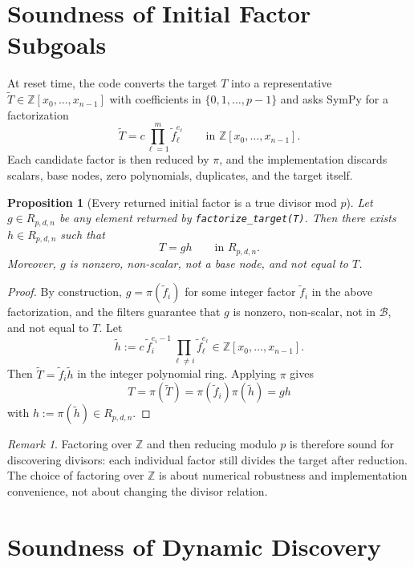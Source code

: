 \documentclass[11pt]{article}
\newtheorem{proposition}[theorem]{Proposition}
\theoremstyle{remark}
\newtheorem{remark}[theorem]{Remark}
\newcommand{\Z}{\mathbb{Z}}
\newcommand{\B}{\mathcal{B}}
\begin{document}
\section{Soundness of Initial Factor Subgoals}

At reset time, the code converts the target $T$ into a representative
$\widetilde{T} \in \Z[x_0,\dots,x_{n-1}]$ with coefficients in
$\{0,1,\dots,p-1\}$ and asks SymPy for a factorization
\[
\widetilde{T}
=
c \prod_{\ell=1}^m \widetilde{f}_{\ell}^{e_\ell}
\qquad
\text{in }
\Z[x_0,\dots,x_{n-1}].
\]
Each candidate factor is then reduced by $\pi$, and the implementation discards
scalars, base nodes, zero polynomials, duplicates, and the target itself.

\begin{proposition}[Every returned initial factor is a true divisor mod $p$]
Let $g \in R_{p,d,n}$ be any element returned by
\texttt{factorize\_target(T)}. Then there exists
$h \in R_{p,d,n}$ such that
\[
T = g h
\qquad \text{in } R_{p,d,n}.
\]
Moreover, $g$ is nonzero, non-scalar, not a base node, and not equal to $T$.
\end{proposition}

\begin{proof}
By construction, $g = \pi(\widetilde{f}_i)$ for some integer factor
$\widetilde{f}_i$ in the above factorization, and the filters guarantee that
$g$ is nonzero, non-scalar, not in $\B$, and not equal to $T$. Let
\[
\widetilde{h}
:=
c \, \widetilde{f}_i^{e_i-1} \prod_{\ell \neq i} \widetilde{f}_{\ell}^{e_\ell}
\in \Z[x_0,\dots,x_{n-1}].
\]
Then $\widetilde{T} = \widetilde{f}_i \widetilde{h}$ in the integer polynomial
ring. Applying $\pi$ gives
\[
T
=
\pi(\widetilde{T})
=
\pi(\widetilde{f}_i)\pi(\widetilde{h})
=
g h
\]
with $h := \pi(\widetilde{h}) \in R_{p,d,n}$.
\end{proof}

\begin{remark}
Factoring over $\Z$ and then reducing modulo $p$ is therefore sound for
discovering divisors: each individual factor still divides the target after
reduction. The choice of factoring over $\Z$ is about numerical robustness and
implementation convenience, not about changing the divisor relation.
\end{remark}

\section{Soundness of Dynamic Discovery}
\end{document}
